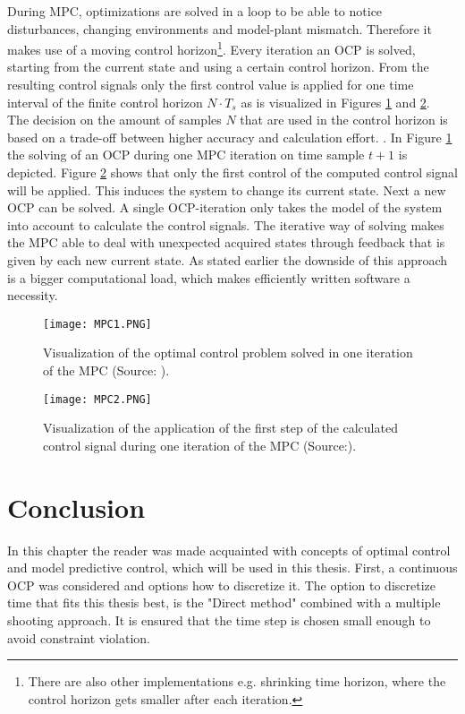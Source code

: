 During MPC, optimizations are solved in a loop to be able to notice disturbances, changing environments and model-plant mismatch. Therefore it makes use of a moving control horizon\footnote{There are also other implementations e.g. shrinking time horizon, where the control horizon gets smaller after each iteration.}. Every iteration an OCP is solved, starting from the current state and using a certain control horizon.  From the resulting control signals only the first control value is applied for one time interval of the finite control horizon $N\cdot T_{s}$ as is visualized in Figures \ref{fig:MPC1} and \ref{fig:MPC2}.\\
The decision on the amount of samples $N$ that are used in the control horizon is based on a trade-off between higher accuracy and calculation effort. \cite{TongDuySon2019, Mercy2018}. In Figure \ref{fig:MPC1} the solving of an OCP during one MPC iteration on time sample $t+1$ is depicted. Figure \ref{fig:MPC2} shows that only the first control of the computed control signal will be applied.  This induces the system to change its current state. Next a new OCP can be solved. A single OCP-iteration only takes the model of the system into account to calculate the control signals. The iterative way of solving makes the MPC able to deal with unexpected acquired states through feedback that is given by each new current state. As stated earlier the downside of this approach is a bigger computational load, which makes efficiently written software a necessity.  \cite{Patrinos2019}\\

\begin{figure}[h!]
	\centering
	\texttt{[image: MPC1.PNG]}
	\caption{Visualization of the optimal control problem solved in one iteration of the MPC (Source: \cite{Patrinos2019}).}
	\label{fig:MPC1}
\end{figure}

\begin{figure}[h!]
	\centering
	\texttt{[image: MPC2.PNG]}
	\caption{Visualization of the application of the first step of the calculated control signal during one iteration of the MPC (Source:\cite{Patrinos2019}).}
	\label{fig:MPC2}
\end{figure}


\section{Conclusion}
In this chapter the reader was made acquainted with concepts of optimal control and model predictive control, which will be used in this thesis. 
First, a continuous OCP was considered and options how to discretize it. The option to discretize time that fits this thesis best, is the "Direct method" combined with a multiple shooting approach. It is ensured that the time step is chosen small enough to avoid constraint violation.

